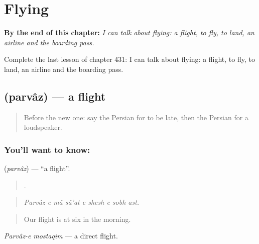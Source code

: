 
\chapter{Flying}
\label{ch:fa-flying}

\begin{chapteropening}
\textbf{By the end of this chapter:} \emph{I can talk about flying: a flight, to fly, to land, an airline and the boarding pass.}

Complete the last lesson of chapter 431: I can talk about flying: a flight, to fly, to land, an airline and the boarding pass.
\end{chapteropening}

\section[\texorpdfstring{\fa{پرواز} (parvâz)}{پرواز (parvâz)}]{ (parvâz) — a flight}

\label{lesson:FA-C431-parvaz}



\begin{quote}
Before the new one: say the Persian for to be late, then the Persian for a loudspeaker.
\end{quote}

\subsection*{You'll want to know: }
\textbf{} (\emph{parvâz}) — \textquotedblleft{}a flight\textquotedblright{}.

\begin{quote}
     .
\end{quote}

\begin{quote}
\emph{Parvâz-e mâ sâ'at-e shesh-e sobh ast.}
\end{quote}

\begin{quote}
Our flight is at six in the morning.
\end{quote}

\emph{Parvâz-e mostaqim} — a direct flight.

